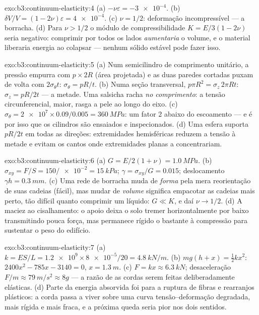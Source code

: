 \begin{solution}{exo:b3:continuum-elasticity:4}
(a) $-\nu\varepsilon = \num{-3e-4}$. (b) $\delta V/V = (1 -
2\nu)\varepsilon = \num{4e-4}$. (c) $\nu = 1/2$: deformação
incompressível --- a borracha. (d) Para $\nu > 1/2$ o módulo de
compressibilidade $K =
E/3(1 - 2\nu)$ seria negativo: comprimir por todos os lados
\emph{aumentaria} o volume, e o material liberaria energia ao
colapsar --- nenhum sólido estável pode fazer isso.
\end{solution}

\begin{solution}{exo:b3:continuum-elasticity:5}
(a) Num semicilindro de comprimento unitário, a pressão empurra com $p
\times 2R$ (área projetada) e as duas paredes cortadas puxam de volta
com $2\sigma_\theta t$: $\sigma_\theta = pR/t$. (b) Numa seção
transversal, $p\pi R^2 = \sigma_z\,2\pi Rt$: $\sigma_z = pR/2t$ --- a
metade. Uma salsicha racha \emph{no comprimento}: a tensão
circunferencial, maior, rasga a pele ao longo do eixo. (c)
$\sigma_\theta = \num{2e7} \times
0.09/0.005 = \qty{360}{MPa}$: um fator $2$ abaixo do escoamento --- e é
por isso que os cilindros são ensaiados e inspecionados. (d) Uma esfera
suporta $pR/2t$ em todas as direções: extremidades hemisféricas
reduzem a tensão à metade e evitam os cantos onde extremidades planas a
concentrariam.
\end{solution}

\begin{solution}{exo:b3:continuum-elasticity:6}
(a) $G = E/2(1 + \nu) = \qty{1.0}{MPa}$. (b) $\sigma_{xy} = F/S =
150/\num{e-2} = \qty{15}{kPa}$; $\gamma = \sigma_{xy}/G = 0.015$;
deslocamento $\gamma h = \qty{0.3}{mm}$. (c) Uma rede de borracha muda
de \emph{forma} pela mera reorientação de suas cadeias (fácil), mas
mudar de \emph{volume} significa empacotar as cadeias mais perto, tão
difícil quanto comprimir um líquido: $G \ll K$, e daí $\nu \to 1/2$.
(d) A maciez ao cisalhamento: o apoio deixa o solo tremer
horizontalmente por baixo transmitindo pouca força, mas permanece
rígido o bastante à compressão para sustentar o peso do edifício.
\end{solution}

\begin{solution}{exo:b3:continuum-elasticity:7}
(a) $k = ES/L = \num{1.2e9} \times \num{8e-5}/20 = \qty{4.8}{kN/m}$.
(b) $mg(h + x) = \tfrac12 kx^2$: $2400x^2 - 785x - 3140 = 0$, $x =
\qty{1.3}{m}$. (c) $F = kx \approx \qty{6.3}{kN}$; desaceleração $F/m
\approx \qty{79}{m/s^2} \approx 8g$ --- a razão de as cordas serem
feitas deliberadamente elásticas. (d) Parte da energia absorvida foi
para a ruptura de fibras e rearranjos plásticos: a corda passa a viver
sobre uma curva tensão--deformação degradada, mais rígida e mais
fraca, e a próxima queda seria pior nos dois sentidos.
\end{solution}

